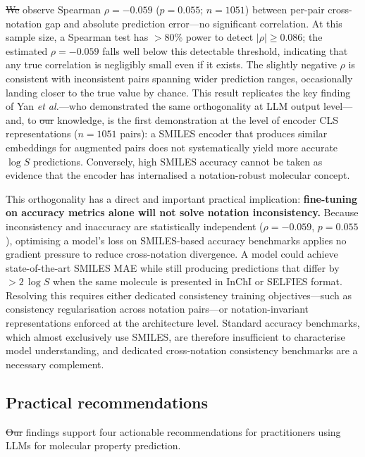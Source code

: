 \documentclass[twoside,twocolumn,9pt]{article}
\makeatletter
\newcommand{\logS}{\ensuremath{\log S}}
\providecommand{\DIFaddtex}[1]{{\protect\color{blue}\uwave{#1}}} %
\providecommand{\DIFdeltex}[1]{{\protect\color{red}\sout{#1}}} %
\providecommand{\DIFaddbegin}{} %
\providecommand{\DIFaddend}{} %
\providecommand{\DIFdelbegin}{} %
\providecommand{\DIFdelend}{} %
\providecommand{\DIFadd}[1]{\texorpdfstring{\DIFaddtex{#1}}{#1}} %
\providecommand{\DIFdel}[1]{\texorpdfstring{\DIFdeltex{#1}}{}} %
\providecommand{\DIFscaledelfig}{0.5}
\newlength{\DIFdelgraphicswidth} %
\newlength{\DIFdelgraphicsheight} %
\providecommand{\DIFaddincludegraphics}[2][]{{\color{blue}\fbox{\DIFOincludegraphics[#1]{#2}}}} %
\providecommand{\DIFdelincludegraphics}[2][]{%
\sbox{\DIFdelgraphicsbox}{\DIFOincludegraphics[#1]{#2}}%
\settoboxwidth{\DIFdelgraphicswidth}{\DIFdelgraphicsbox} %
\settoboxtotalheight{\DIFdelgraphicsheight}{\DIFdelgraphicsbox} %
\scalebox{\DIFscaledelfig}{%
\parbox[b]{\DIFdelgraphicswidth}{\usebox{\DIFdelgraphicsbox}\\[-\baselineskip] \rule{\DIFdelgraphicswidth}{0em}}\llap{\resizebox{\DIFdelgraphicswidth}{\DIFdelgraphicsheight}{%
\setlength{\unitlength}{\DIFdelgraphicswidth}%
\begin{picture}(1,1)%
\thicklines\linethickness{2pt} %
{\color[rgb]{1,0,0}\put(0,0){\framebox(1,1){}}}%
{\color[rgb]{1,0,0}\put(0,0){\line( 1,1){1}}}%
{\color[rgb]{1,0,0}\put(0,1){\line(1,-1){1}}}%
\end{picture}%
}\hspace*{3pt}}} %
} %
\DeclareRobustCommand{\DIFaddbegin}{\DIFOaddbegin \let\includegraphics\DIFaddincludegraphics} %
\DeclareRobustCommand{\DIFaddend}{\DIFOaddend \let\includegraphics\DIFOincludegraphics} %
\DeclareRobustCommand{\DIFdelbegin}{\DIFOdelbegin \let\includegraphics\DIFdelincludegraphics} %
\DeclareRobustCommand{\DIFdelend}{\DIFOaddend \let\includegraphics\DIFOincludegraphics} %
\let\sout@orig\sout %
\renewcommand{\sout}[1]{\ifmmode\text{\sout@orig{\ensuremath{#1}}}\else\sout@orig{#1}\fi} %
\makeatother
\begin{document}
\DIFdelbegin \DIFdel{We }\DIFdelend \DIFaddbegin \DIFadd{I }\DIFaddend observe Spearman $\rho = -0.059$ ($p=0.055$; $n=1051$) between per-pair cross-notation gap and absolute prediction error---no significant correlation. At this sample size, a Spearman test has $>80\%$ power to detect $|\rho|\geq 0.086$; the estimated $\rho=-0.059$ falls well below this detectable threshold, indicating that any true correlation is negligibly small even if it exists. The slightly negative $\rho$ is consistent with inconsistent pairs spanning wider prediction ranges, occasionally landing closer to the true value by chance. This result replicates the key finding of Yan \textit{et al.}\cite{yan2025}---who demonstrated the same orthogonality at LLM output level---and, to \DIFdelbegin \DIFdel{our }\DIFdelend \DIFaddbegin \DIFadd{my }\DIFaddend knowledge, is the first demonstration at the level of encoder CLS representations ($n=1051$ pairs): a SMILES encoder that produces similar embeddings for augmented pairs does not systematically yield more accurate $\logS$ predictions. Conversely, high SMILES accuracy cannot be taken as evidence that the encoder has internalised a notation-robust molecular concept.

This orthogonality has a direct and important practical implication: \textbf{fine-tuning on accuracy metrics alone will not solve notation inconsistency.} Because inconsistency and inaccuracy are statistically independent ($\rho=-0.059$, $p=0.055$), optimising a model's loss on SMILES-based accuracy benchmarks applies no gradient pressure to reduce cross-notation divergence. A model could achieve state-of-the-art SMILES MAE while still producing predictions that differ by $>2\,\logS$ when the same molecule is presented in InChI or SELFIES format. Resolving this requires either dedicated consistency training objectives---such as consistency regularisation across notation pairs---or notation-invariant representations enforced at the architecture level. Standard accuracy benchmarks, which almost exclusively use SMILES,\cite{ganeeva2025} are therefore insufficient to characterise model understanding, and dedicated cross-notation consistency benchmarks are a necessary complement.

\subsection{Practical recommendations}
\DIFaddbegin \label{sec:recommend}
\DIFaddend 

\DIFdelbegin \DIFdel{Our }\DIFdelend \DIFaddbegin \DIFadd{My }\DIFaddend findings support four actionable recommendations for practitioners using LLMs for molecular property prediction.
\end{document}

